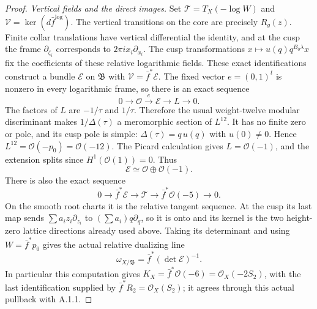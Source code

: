 \begin{proof}
\emph{Vertical fields and the direct images.}
Set $\mathcal T=T_X(-\log W)$ and
$\mathcal V=\ker(d\bar f^{\log})$.
The vertical transitions on the core are precisely $R_g(z)$.
Finite collar translations have vertical differential the identity,
and at the cusp the frame $\partial_{\zeta_i}$ corresponds to
$2\pi i x_i\partial_{x_i}$. The cusp transformations
$x\mapsto u(q)q^{B_0\lambda}x$ fix the coefficients of these
relative logarithmic fields. These exact identifications construct
a bundle $\mathcal E$ on $\mathfrak B$ with
$\mathcal V=\bar f^*\mathcal E$.
The fixed vector $e=(0,1)^t$ is nonzero in every logarithmic frame,
so there is an exact sequence
\[
 0\longrightarrow\mathcal O\xrightarrow{e}\mathcal E
 \longrightarrow L\longrightarrow0.
\]
The factors of $L$ are $-1/\tau$ and $1/\tau$. Therefore the usual
weight-twelve modular discriminant makes $1/\Delta(\tau)$ a
meromorphic section of $L^{12}$. It has no finite zero or pole,
and its cusp pole is simple: $\Delta(\tau)=q\,u(q)$ with
$u(0)\ne0$. Hence $L^{12}=\mathcal O(-p_0)=\mathcal O(-12)$.
The Picard calculation gives $L=\mathcal O(-1)$, and the extension
splits since $H^1(\mathcal O(1))=0$. Thus
\[
 \mathcal E\simeq\mathcal O\oplus\mathcal O(-1).
\]
There is also the exact sequence
\begin{equation}\label{eq:ab-log-tangent}
 0\longrightarrow\bar f^*\mathcal E\longrightarrow\mathcal T
 \longrightarrow\bar f^*\mathcal O(-5)\longrightarrow0.
\end{equation}
On the smooth root charts it is the relative tangent sequence. At the
cusp its last map sends $\sum a_i z_i\partial_{z_i}$ to
$(\sum a_i)q\partial_q$, so it is onto and its kernel is the
two height-zero lattice directions already used above. Taking its
determinant and using $W=\bar f^*p_0$ gives the actual relative
dualizing line
\begin{equation}\label{eq:ab-relative-dualizing}
 \omega_{X/\mathfrak B}=\bar f^*(\det\mathcal E)^{-1}.
\end{equation}
In particular this computation gives
$K_X=\bar f^*\mathcal O(-6)=\mathcal O_X(-2S_2)$, with the last
identification supplied by $\bar f^*R_2=\mathcal O_X(S_2)$;
it agrees through this actual pullback with A.1.1.


\end{proof}

